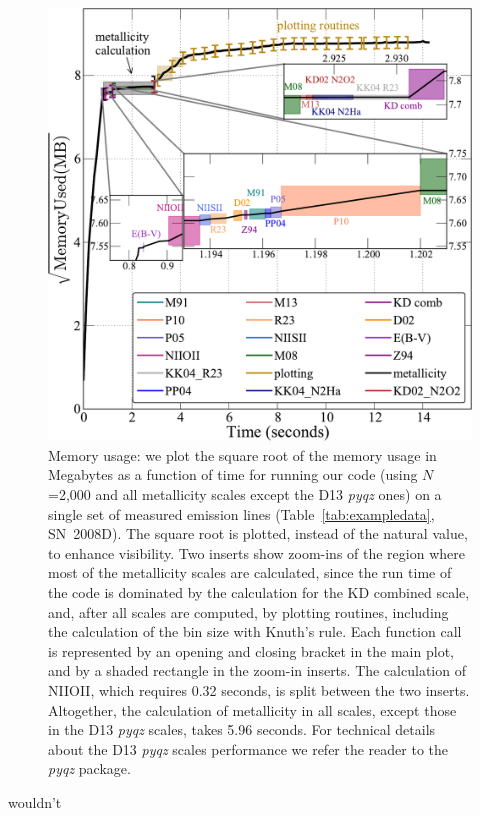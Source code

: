 \documentclass{emulateapj}
\begin{document}
\begin{figure}[ht!]
  \includegraphics[width=1.0\columnwidth]{memusage.pdf}
   \caption{Memory usage: we plot the square root of the memory usage in Megabytes as a function of time for running our code (using $N$=2,000 and all metallicity scales except the D13 \emph{pyqz} ones) on a single set of measured emission lines (Table~\ref{tab:exampledata}, SN~2008D). The square root is plotted, instead of the natural value, to enhance visibility.  
Two inserts show zoom-ins of the region where most of the metallicity scales are calculated, since the run time of the code is dominated by the calculation for the KD combined scale, and, after all scales are computed, by plotting routines, including the calculation of the bin size with Knuth's rule. 
Each function call is represented by an opening and closing bracket in the main plot, and by a shaded rectangle in the zoom-in inserts.%
The calculation of NIIOII, which requires 0.32 seconds, is split between the two inserts. Altogether, the calculation of metallicity in all scales, except those in the D13 \emph{pyqz} scales, takes 5.96 seconds. For technical details about the D13 \emph{pyqz} scales performance we refer the reader to the \emph{pyqz} package.}
 \label{fig:mem}
\end{figure}
wouldn't
\end{document}
